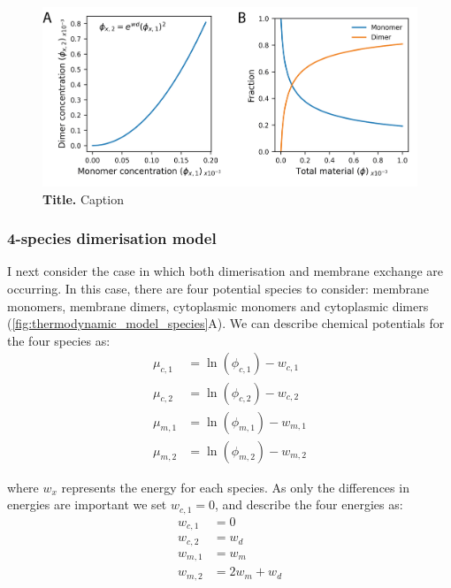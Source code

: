 \documentclass[12pt]{"article"}
\newcommand{\mycaption}[2]{\caption[#1]{\textbf{#1.} #2}}
\begin{document}
\begin{figure}[!h]
\includegraphics[scale=1]{thermodynamic_simple_dimer}
\setlength{\abovecaptionskip}{20pt}
\centering
\mycaption{Title}{Caption}
\label{fig:thermodynamic_simple_dimer}
\end{figure}


\subsubsection{4-species dimerisation model}

I next consider the case in which both dimerisation and membrane exchange are occurring. In this case, there are four potential species to consider: membrane monomers, membrane dimers, cytoplasmic monomers and cytoplasmic dimers (\cref{fig:thermodynamic_model_species}A). We can describe chemical potentials for the four species as:
\begin{align}
\mu_{c,1} &= \ln(\phi_{c,1}) - w_{c,1}\\
\mu_{c,2} &= \ln(\phi_{c,2}) - w_{c,2}\\
\mu_{m,1} &= \ln(\phi_{m,1}) - w_{m,1}\\
\mu_{m,2} &= \ln(\phi_{m,2}) - w_{m,2}
\end{align}

where $w_x$ represents the energy for each species. As only the differences in energies are important we set $w_{c,1} = 0$, and describe the four energies as:
\begin{align}
w_{c,1} &= 0\\
w_{c,2} &= w_d\\
w_{m,1} &= w_m\\
w_{m,2} &= 2w_m + w_d
\end{align}
\end{document}
